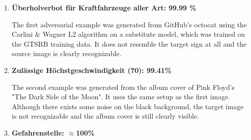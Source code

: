 \begin{enumerate}
\item
\textbf{Überholverbot für Kraftfahrzeuge aller Art: 99.99 \%}

The first adversarial example was generated from Git\-Hub's octocat using the Carlini \& Wagner L2 algorithm on a substitute model,
which was trained on the GTSRB training data.
It does not resemble the target sign at all and the source image is clearly recognizable.

\item
\textbf{Zulässige Höchstgeschwindigkeit (70): 99.41\%}

The second example was generated from the album cover of Pink Floyd's "The Dark Side of the Moon".
It uses the same setup as the first image.
Although there exists some noise on the black background, the target image is not recognizable and the album cover is still clearly visible.

\item
\textbf{Gefahrenstelle: $\approx$100\%}


\end{enumerate}

